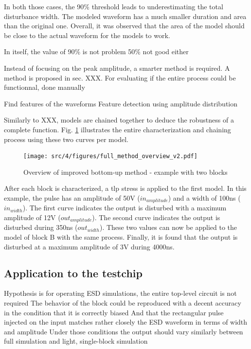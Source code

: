 In both those cases, the 90\% threshold leads to underestimating the total disturbance width.
The modeled waveform has a much smaller duration and area than the original one.
Overall, it was observed that the area of the model should be close to the actual waveform for the models to work.

In itself, the value of 90\% is not problem
50\% not good either

Instead of focusing on the peak amplitude, a smarter method is required.
A method is proposed in sec. XXX.
For evaluating if the entire process could be functionnal, done manually

Find features of the waveforms
Feature detection using amplitude distribution

Similarly to XXX, models are chained together to deduce the robustness of a complete function.
Fig. \ref{fig:full-method-v2} illustrates the entire characterization and chaining process using these two curves per model.

\begin{figure}[!hp]
  \centering
  \texttt{[image: src/4/figures/full\_method\_overview\_v2.pdf]}
  \caption{Overview of improved bottom-up method - example with two blocks}
  \label{fig:full-method-v2}
\end{figure}

After each block is characterized, a \gls{tlp} stress is applied to the first model.
In this example, the pulse has an amplitude of 50V ($in_{amplitude}$) and a width of 100ns ($in_{width}$).
The first curve indicates the output is disturbed with a maximum amplitude of 12V ($out_{amplitude}$).
The second curve indicates the output is disturbed during 350ns ($out_{width}$).
These two values can now be applied to the model of block B with the same process.
Finally, it is found that the output is disturbed at a maximum amplitude of 3V during 4000ns.

\subsection{Application to the testchip}

Hypothesis is for operating ESD simulations, the entire top-level circuit is not required
The behavior of the block could be reproduced with a decent accuracy
in the condition that it is correctly biased
And that the rectangular pulse injected on the input matches rather closely the ESD waveform in terms of width and amplitude
Under those conditions the output should vary similarly between full simulation and light, single-block simulation

